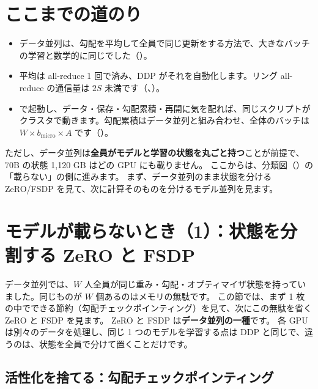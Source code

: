 \section*{ここまでの道のり}
\begin{itemize}
\item データ並列は、勾配を平均して全員で同じ更新をする方法で、大きなバッチの学習と数学的に同じでした（）。
\item 平均は all-reduce 1 回で済み、DDP がそれを自動化します。リング all-reduce の通信量は $2S$ 未満です（、）。
\item {} で起動し、データ・保存・勾配累積・再開に気を配れば、同じスクリプトがクラスタで動きます。勾配累積はデータ並列と組み合わせ、全体のバッチは $W\times b_{\text{micro}}\times A$ です（）。
\end{itemize}
ただし、データ並列は\textbf{全員がモデルと学習の状態を丸ごと持つ}ことが前提で、70B の状態 1,120 GB はどの GPU にも載りません。
ここからは、分類図（）の「載らない」の側に進みます。
まず、データ並列のまま状態を分ける ZeRO/FSDP を見て、次に計算そのものを分けるモデル並列を見ます。

\section{モデルが載らないとき（1）：状態を分割する ZeRO と FSDP}\label{sec:dist-sharding}

データ並列では、$W$ 人全員が同じ重み・勾配・オプティマイザ状態を持っていました。同じものが $W$ 個あるのはメモリの無駄です。
この節では、まず 1 枚の中でできる節約（勾配チェックポインティング）を見て、次にこの無駄を省く ZeRO と FSDP を見ます。
ZeRO と FSDP は\textbf{データ並列の一種}です。
各 GPU は別々のデータを処理し、同じ 1 つのモデルを学習する点は DDP と同じで、違うのは、状態を全員で分けて置くことだけです。

\subsection*{活性化を捨てる：勾配チェックポインティング}

